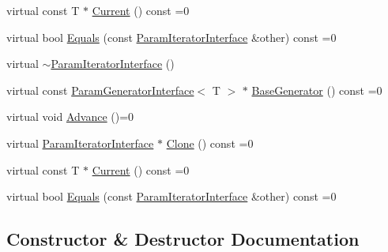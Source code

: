 \begin{DoxyCompactItemize}
\item 
virtual const T $\ast$ \mbox{\hyperlink{classtesting_1_1internal_1_1_param_iterator_interface_adfff808576d929085679c315b255af7e}{Current}} () const =0
\item 
virtual bool \mbox{\hyperlink{classtesting_1_1internal_1_1_param_iterator_interface_a9d811697a752d46f7bd6a0082f9040a3}{Equals}} (const \mbox{\hyperlink{classtesting_1_1internal_1_1_param_iterator_interface}{Param\+Iterator\+Interface}} \&other) const =0
\item 
virtual \mbox{\hyperlink{classtesting_1_1internal_1_1_param_iterator_interface_adf6ba49e6b54a6e3b15dbd5733988bef}{$\sim$\+Param\+Iterator\+Interface}} ()
\item 
virtual const \mbox{\hyperlink{classtesting_1_1internal_1_1_param_generator_interface}{Param\+Generator\+Interface}}$<$ T $>$ $\ast$ \mbox{\hyperlink{classtesting_1_1internal_1_1_param_iterator_interface_a17500953df75ecda1ace46c08ff731e9}{Base\+Generator}} () const =0
\item 
virtual void \mbox{\hyperlink{classtesting_1_1internal_1_1_param_iterator_interface_a600dbd35fcb551463e379516a1abea48}{Advance}} ()=0
\item 
virtual \mbox{\hyperlink{classtesting_1_1internal_1_1_param_iterator_interface}{Param\+Iterator\+Interface}} $\ast$ \mbox{\hyperlink{classtesting_1_1internal_1_1_param_iterator_interface_a4998c23e27e2943d97546011aa35db80}{Clone}} () const =0
\item 
virtual const T $\ast$ \mbox{\hyperlink{classtesting_1_1internal_1_1_param_iterator_interface_adfff808576d929085679c315b255af7e}{Current}} () const =0
\item 
virtual bool \mbox{\hyperlink{classtesting_1_1internal_1_1_param_iterator_interface_a9d811697a752d46f7bd6a0082f9040a3}{Equals}} (const \mbox{\hyperlink{classtesting_1_1internal_1_1_param_iterator_interface}{Param\+Iterator\+Interface}} \&other) const =0
\end{DoxyCompactItemize}


\subsection{Constructor \& Destructor Documentation}
\mbox{\label{classtesting_1_1internal_1_1_param_iterator_interface_adf6ba49e6b54a6e3b15dbd5733988bef}} 
